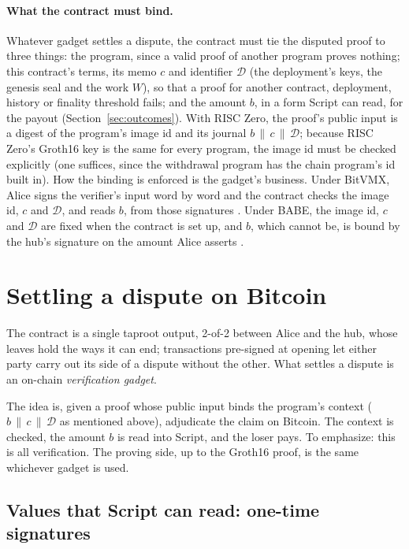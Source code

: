 \documentclass[11pt]{article}
\begin{document}
\paragraph{What the contract must bind.} Whatever gadget settles a
dispute, the contract must tie the disputed proof to three things: the
program, since a valid proof of another program proves nothing; this
contract's terms, its memo $c$ and identifier $\mathcal{D}$ (the deployment's keys,
the genesis seal and the work $W$), so that a proof for another contract,
deployment, history or finality threshold fails; and the amount $b$, in a
form Script can read, for the payout (Section~\ref{sec:outcomes}). With
RISC Zero, the proof's public input is a digest of the program's image id
and its journal $b \,\|\, c \,\|\, \mathcal{D}$; because RISC Zero's Groth16 key is
the same for every program, the image id must be checked explicitly (one
suffices, since the withdrawal program has the chain program's id built
in). How the binding is enforced is the gadget's business. Under BitVMX,
Alice signs the verifier's input word by word and the contract checks the
image id, $c$ and $\mathcal{D}$, and reads $b$, from those signatures
\cite[\S 2]{lichenbitvmx}. Under BABE, the image id, $c$ and $\mathcal{D}$ are fixed
when the contract is set up, and $b$, which cannot be, is bound by the
hub's signature on the amount Alice asserts \cite[\S 5]{lichenbabe}.



\section{Settling a dispute on Bitcoin}
\label{sec:blocks}

The contract is a single taproot output, 2-of-2 between Alice and the
hub, whose leaves hold the ways it can end; transactions pre-signed at
opening let either party carry out its side of a dispute without the
other. What settles a dispute is an on-chain \emph{verification gadget}.

The idea is, given a proof whose public input binds the
program's context ($b \,\|\, c \,\|\, \mathcal{D}$ as mentioned above), adjudicate the
claim on Bitcoin. The context is checked, the amount $b$ is read into Script, and the loser pays. To emphasize: this is all verification. The proving side, up to the Groth16 proof, is the same whichever gadget is used.

\subsection{Values that Script can read: one-time signatures}
\end{document}
